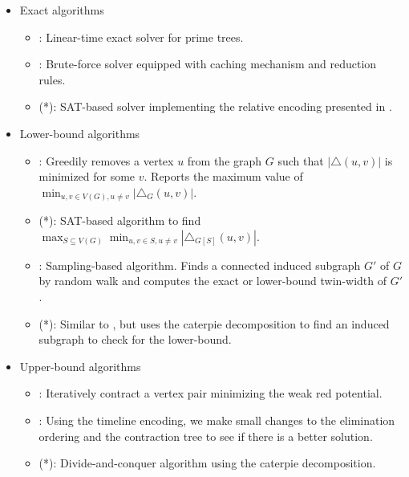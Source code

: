 \documentclass[a4paper,UKenglish,cleveref, autoref, thm-restate]{lipics-v2021}
\begin{document}
\begin{itemize}
    \item Exact algorithms
    \begin{itemize}
        \item \primetreesolver : Linear-time exact solver for prime trees.
        \item \branchsolver : Brute-force solver equipped with caching mechanism and reduction rules.
        \item \directsolver (*): SAT-based solver implementing the relative encoding presented in \cite{schidler_sat_2021}.
    \end{itemize}
    \item Lower-bound algorithms
    \begin{itemize}
        \item \lbgreedy : Greedily removes a vertex $u$ from the graph $G$
        such that $|\triangle(u,v)|$ is minimized for some $v$.
        Reports the maximum value of $\displaystyle \min_{u,v \in V(G), u \neq v} |\triangle_{G} (u,v)|$.
        \item \lbcore (*): SAT-based algorithm to find 
        $\displaystyle \max_{S \subseteq V(G)} \min_{u,v \in S, u \neq v} |\triangle_{G[S]} (u,v)|$.
        \item \lbsample : Sampling-based algorithm.
        Finds a connected induced subgraph $G'$ of $G$
        by random walk and computes the exact or lower-bound twin-width of $G'$.
        \item \lbseparate (*): Similar to \lbsample, but uses the caterpie decomposition to
        find an induced subgraph to check for the lower-bound.
    \end{itemize}
    \item Upper-bound algorithms
    \begin{itemize}
        \item \ubgreedy : Iteratively contract a vertex pair minimizing the weak red potential.
        \item \ublocalsearch : Using the timeline encoding, we make small changes to
        the elimination ordering and the contraction tree to see if there is a better solution.
        \item \ubseparate (*): Divide-and-conquer algorithm using the caterpie decomposition.
    \end{itemize}
\end{itemize}

\end{document}
